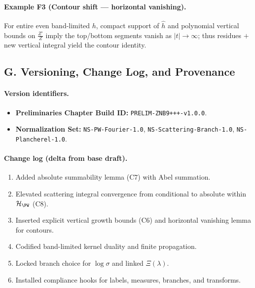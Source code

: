 \paragraph{Example F3 (Contour shift — horizontal vanishing).}
For entire even band-limited $h$, compact support of $\hat h$ and polynomial vertical bounds on $\frac{Z'}{Z}$ imply the top/bottom segments vanish as $|t|\to\infty$; thus residues $+$ new vertical integral yield the contour identity.


\subsection*{G. Versioning, Change Log, and Provenance}
\label{subsec:versioning-max}

\paragraph{Version identifiers.}
\begin{itemize}
  \item \textbf{Preliminaries Chapter Build ID:} \texttt{PRELIM-ZNB9+++-v1.0.0}.
  \item \textbf{Normalization Set:} \texttt{NS-PW-Fourier-1.0}, \texttt{NS-Scattering-Branch-1.0}, \texttt{NS-Plancherel-1.0}.
\end{itemize}

\paragraph{Change log (delta from base draft).}
\begin{enumerate}[label=(\roman*)]
  \item Added absolute summability lemma (C7) with Abel summation.
  \item Elevated scattering integral convergence from conditional to absolute within $\mathcal H_{\PW}$ (C8).
  \item Inserted explicit vertical growth bounds (C6) and horizontal vanishing lemma for contours.
  \item Codified band-limited kernel duality and finite propagation.
  \item Locked branch choice for $\log\sigma$ and linked $\Xi(\lambda)$.
  \item Installed compliance hooks for labels, measures, branches, and transforms.
\end{enumerate}

